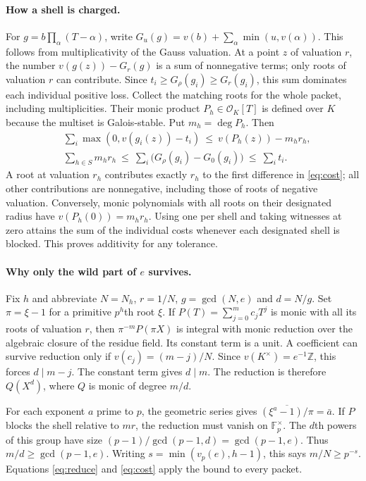 \paragraph{How a shell is charged.}
For $g=b\prod_\alpha(T-\alpha)$, write $G_u(g)=v(b)+\sum_\alpha\min(u,v(\alpha))$. This follows from multiplicativity of the Gauss valuation. At a point $z$ of valuation $r$, the number $v(g(z))-G_r(g)$ is a sum of nonnegative terms; only roots of valuation $r$ can contribute. Since $t_i\ge G_\rho(g_i)\ge G_r(g_i)$, this sum dominates each individual positive loss. Collect the matching roots for the whole packet, including multiplicities. Their monic product $P_h\in\mathcal O_K[T]$ is defined over $K$ because the multiset is Galois-stable. Put $m_h=\deg P_h$. Then
\begin{align}
 &\sum_i\max(0,v(g_i(z))-t_i)\ \le\ v(P_h(z))-m_h r_h, \label{eq:reduce}\\
 &\sum_{h\in S}m_h r_h
 \ \le\ \sum_i\bigl(G_\rho(g_i)-G_0(g_i)\bigr)\ \le\ \sum_i t_i. \label{eq:cost}
\end{align}
A root at valuation $r_h$ contributes exactly $r_h$ to the first difference in \eqref{eq:cost}; all other contributions are nonnegative, including those of roots of negative valuation. Conversely, monic polynomials with all roots on their designated radius have $v(P_h(0))=m_hr_h$. Using one per shell and taking witnesses at zero attains the sum of the individual costs whenever each designated shell is blocked. This proves additivity for any tolerance.

\paragraph{Why only the wild part of $e$ survives.}
Fix $h$ and abbreviate $N=N_h$, $r=1/N$, $g=\gcd(N,e)$ and $d=N/g$. Set $\pi=\xi-1$ for a primitive $p^h$th root $\xi$. If $P(T)=\sum_{j=0}^m c_jT^j$ is monic with all its roots of valuation $r$, then $\pi^{-m}P(\pi X)$ is integral with monic reduction over the algebraic closure of the residue field. Its constant term is a unit. A coefficient can survive reduction only if $v(c_j)=(m-j)/N$. Since $v(K^\times)=e^{-1}\mathbb Z$, this forces $d\mid m-j$. The constant term gives $d\mid m$. The reduction is therefore $Q(X^d)$, where $Q$ is monic of degree $m/d$.

For each exponent $a$ prime to $p$, the geometric series gives
$\overline{(\xi^a-1)/\pi}=\bar a$. If $P$ blocks the shell relative to $mr$, the reduction must vanish on $\mathbb F_p^\times$. The $d$th powers of this group have size $(p-1)/\gcd(p-1,d)=\gcd(p-1,e)$. Thus $m/d\ge\gcd(p-1,e)$. Writing $s=\min(v_p(e),h-1)$, this says $m/N\ge p^{-s}$. Equations \eqref{eq:reduce} and \eqref{eq:cost} apply the bound to every packet.

